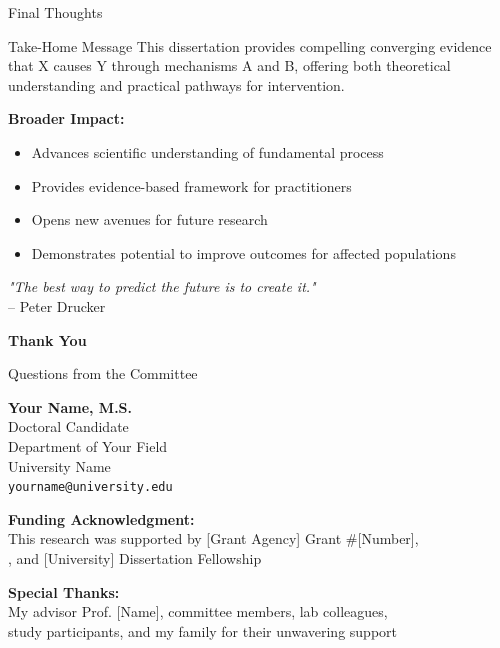 \documentclass[aspectratio=169,12pt]{beamer}
\begin{document}
\begin{frame}{Final Thoughts}
  \begin{block}{Take-Home Message}
    This dissertation provides compelling converging evidence that X causes Y through mechanisms A and B, offering both theoretical understanding and practical pathways for intervention.
  \end{block}

  \vspace{1cm}

  \textbf{Broader Impact:}
  \begin{itemize}
    \item Advances scientific understanding of fundamental process
    \item Provides evidence-based framework for practitioners
    \item Opens new avenues for future research
    \item Demonstrates potential to improve outcomes for affected populations
  \end{itemize}

  \vspace{1cm}

  \begin{center}
    \textit{"The best way to predict the future is to create it."} \\
    -- Peter Drucker
  \end{center}
\end{frame}

\begin{frame}[plain]
  \begin{center}
    {\LARGE \textbf{Thank You}}

    \vspace{1cm}

    {\Large Questions from the Committee}

    \vspace{1.5cm}

    \textbf{Your Name, M.S.}\\
    Doctoral Candidate\\
    Department of Your Field\\
    University Name\\
    \texttt{yourname@university.edu}

    \vspace{1cm}

    {\footnotesize
      \textbf{Funding Acknowledgment:}\\
      This research was supported by [Grant Agency] Grant \#[Number],\\
      [Fellowship Name], and [University] Dissertation Fellowship

      \vspace{0.5cm}

      \textbf{Special Thanks:}\\
      My advisor Prof. [Name], committee members, lab colleagues,\\
      study participants, and my family for their unwavering support
    }
  \end{center}
\end{frame}
\end{document}
